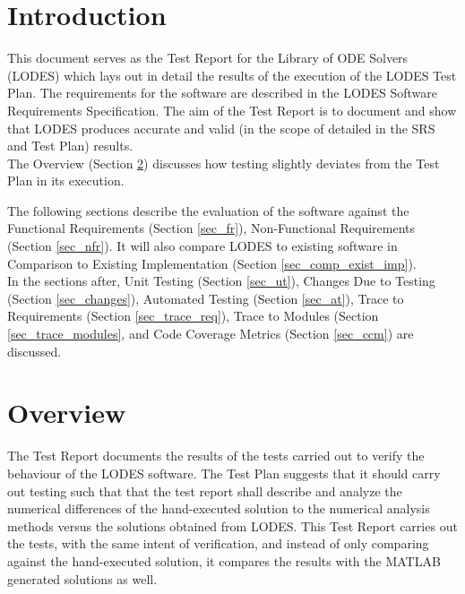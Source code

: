 \documentclass[12pt, titlepage]{article}
\newcommand{\famname}{LODES} %
\newcommand{\famdesc}{Library of ODE Solvers}
\begin{document}

\newpage

\tableofcontents

\listoftables %

\listoffigures %

\newpage


\section{Introduction}

This document serves as the Test Report for the \famdesc{} (\famname{}) which 
lays out in detail the results of the execution of the \famname{} Test Plan.
The requirements for the software are described in the \famname{} Software
Requirements Specification. The aim of the Test Report is to document and show that
\famname{} produces accurate and valid (in the scope of detailed in the SRS and Test Plan) results.\\

The Overview (Section \ref{sec_overview}) discusses how testing
slightly deviates from the Test Plan in its execution.

The following sections describe the evaluation of the software against the
Functional Requirements (Section \ref{sec_fr}), Non-Functional Requirements
(Section \ref{sec_nfr}). It will also compare \famname{}
to existing software in Comparison to Existing Implementation (Section \ref{sec_comp_exist_imp}).\\

In the sections after, Unit Testing (Section \ref{sec_ut}),
Changes Due to Testing (Section \ref{sec_changes}), Automated Testing (Section \ref{sec_at}),
Trace to Requirements (Section \ref{sec_trace_req}), Trace to Modules (Section \ref{sec_trace_modules},
and Code Coverage Metrics (Section \ref{sec_ccm}) are discussed.\\

\section{Overview} \label{sec_overview}
The Test Report documents the results of the tests
carried out to verify the behaviour of the
\famname{} software. The Test Plan suggests that it should carry out testing such that
that the test report shall describe and analyze the numerical differences of the hand-executed
solution to the numerical analysis methods versus the solutions obtained from \famname{}.
This Test Report carries out the tests, with the same intent of verification, and instead of
only comparing against the hand-executed solution, it compares the results with
the MATLAB generated solutions as well.
\end{document}
